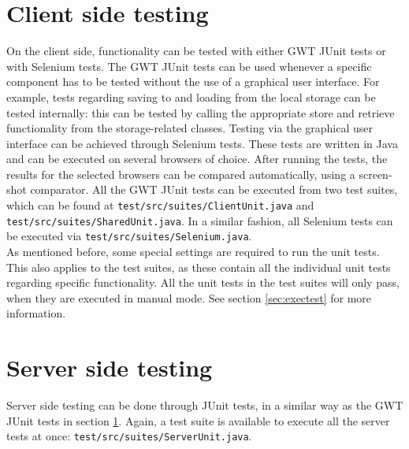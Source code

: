 \section{Client side testing}\label{sec:clientProc}
On the client side, functionality can be tested with either GWT JUnit tests or with Selenium tests. The GWT JUnit tests can be used whenever a specific component has to be tested without the use of a graphical user interface. For example, tests regarding saving to and loading from the local storage can be tested internally: this can be tested by calling the appropriate store and retrieve functionality from the storage-related classes. Testing via the graphical user interface can be achieved through Selenium tests. These tests are written in Java and can be executed on several browsers of choice. After running the tests, the results for the selected browsers can be compared automatically, using a screen-shot comparator.
All the GWT JUnit tests can be executed from two test suites, which can be found at \texttt{test/src/suites/ClientUnit.java} and \texttt{test/src/suites/SharedUnit.java}. In a similar fashion, all Selenium tests can be executed via \texttt{test/src/suites/Selenium.java}. \\
As mentioned before, some special settings are required to run the unit tests. This also applies to the test suites, as these contain all the individual unit tests regarding specific functionality. All the unit tests in the test suites will only pass, when they are executed in manual mode. See section \ref{sec:exectest} for more information.

\section{Server side testing}\label{sec:serverProc}
Server side testing can be done through JUnit tests, in a similar way as the GWT JUnit tests in section \ref{sec:clientProc}. Again, a test suite is available to execute all the server tests at once: \texttt{test/src/suites/ServerUnit.java}.

